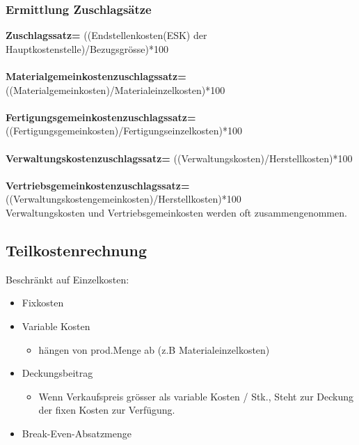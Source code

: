 \documentclass[../ZF_Wing.tex]{subfiles}
\begin{document}
\subsubsection{Ermittlung Zuschlagsätze}

\textbf{Zuschlagssatz=} ((Endstellenkosten(ESK) der Hauptkostenstelle)/Bezugsgrösse)*100
\\ \\

\textbf{Materialgemeinkostenzuschlagssatz=} ((Materialgemeinkosten)/Materialeinzelkosten)*100
\\ \\
\textbf{Fertigungsgemeinkostenzuschlagssatz=} ((Fertigungsgemeinkosten)/Fertigungseinzelkosten)*100
\\ \\

\textbf{Verwaltungskostenzuschlagssatz=} ((Verwaltungskosten)/Herstellkosten)*100\\ \\


\textbf{Vertriebsgemeinkostenzuschlagssatz=} ((Verwaltungskostengemeinkosten)/Herstellkosten)*100\\
Verwaltungskosten und Vertriebsgemeinkosten werden oft zusammengenommen.

\subsection{Teilkostenrechnung}
Beschränkt auf Einzelkosten:
\begin{itemize}
	\item Fixkosten
	\item Variable Kosten
	\begin{itemize}
		\item hängen von prod.Menge ab (z.B Materialeinzelkosten)
	\end{itemize}
	\item Deckungsbeitrag
	\begin{itemize}
		\item Wenn Verkaufspreis grösser als variable Kosten / Stk., Steht zur Deckung der fixen Kosten zur Verfügung.
	\end{itemize}
	\item Break-Even-Absatzmenge
\end{itemize}
\end{document}
